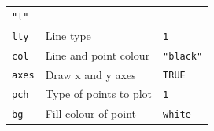 \documentclass[12pt,a4paper]{book}
\theoremstyle{definition}
\theoremstyle{definition}
\theoremstyle{definition}
\theoremstyle{remark}
\begin{document}
\begin{longtable}[]{@{}lll@{}}
\begin{minipage}[t]{0.39\columnwidth}
\texttt{"l"}\strut
\end{minipage}\tabularnewline
\begin{minipage}[t]{0.15\columnwidth}\raggedright
\texttt{lty}\strut
\end{minipage} & \begin{minipage}[t]{0.32\columnwidth}\raggedright
Line type\strut
\end{minipage} & \begin{minipage}[t]{0.39\columnwidth}\raggedright
\texttt{1}\strut
\end{minipage}\tabularnewline
\begin{minipage}[t]{0.15\columnwidth}\raggedright
\texttt{col}\strut
\end{minipage} & \begin{minipage}[t]{0.32\columnwidth}\raggedright
Line and point colour\strut
\end{minipage} & \begin{minipage}[t]{0.39\columnwidth}\raggedright
\texttt{"black"}\strut
\end{minipage}\tabularnewline
\begin{minipage}[t]{0.15\columnwidth}\raggedright
\texttt{axes}\strut
\end{minipage} & \begin{minipage}[t]{0.32\columnwidth}\raggedright
Draw x and y axes\strut
\end{minipage} & \begin{minipage}[t]{0.39\columnwidth}\raggedright
\texttt{TRUE}\strut
\end{minipage}\tabularnewline
\begin{minipage}[t]{0.15\columnwidth}\raggedright
\texttt{pch}\strut
\end{minipage} & \begin{minipage}[t]{0.32\columnwidth}\raggedright
Type of points to plot\strut
\end{minipage} & \begin{minipage}[t]{0.39\columnwidth}\raggedright
\texttt{1}\strut
\end{minipage}\tabularnewline
\begin{minipage}[t]{0.15\columnwidth}\raggedright
\texttt{bg}\strut
\end{minipage} & \begin{minipage}[t]{0.32\columnwidth}\raggedright
Fill colour of point\strut
\end{minipage} & \begin{minipage}[t]{0.39\columnwidth}\raggedright
\texttt{white}\strut
\end{minipage}\tabularnewline
\bottomrule
\end{longtable}
\end{document}
